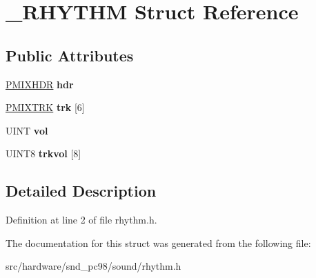 \hypertarget{struct__RHYTHM}{\section{\-\_\-\-R\-H\-Y\-T\-H\-M Struct Reference}
\label{struct__RHYTHM}
}
\subsection*{Public Attributes}
\begin{DoxyCompactItemize}
\item 
\hypertarget{struct__RHYTHM_a12128f9bf695c8169ceeaec1858d3e5b}{\hyperlink{structPMIXHDR}{P\-M\-I\-X\-H\-D\-R} {\bfseries hdr}}\label{struct__RHYTHM_a12128f9bf695c8169ceeaec1858d3e5b}

\item 
\hypertarget{struct__RHYTHM_ab7a544b57e99acaf414eb847476dc15a}{\hyperlink{structPMIXTRK}{P\-M\-I\-X\-T\-R\-K} {\bfseries trk} \mbox{[}6\mbox{]}}\label{struct__RHYTHM_ab7a544b57e99acaf414eb847476dc15a}

\item 
\hypertarget{struct__RHYTHM_a82d0398c7c408620db1954ad2ec5e4e6}{U\-I\-N\-T {\bfseries vol}}\label{struct__RHYTHM_a82d0398c7c408620db1954ad2ec5e4e6}

\item 
\hypertarget{struct__RHYTHM_ae6dc34f8868cc782c2e705e3519ef3a0}{U\-I\-N\-T8 {\bfseries trkvol} \mbox{[}8\mbox{]}}\label{struct__RHYTHM_ae6dc34f8868cc782c2e705e3519ef3a0}

\end{DoxyCompactItemize}


\subsection{Detailed Description}


Definition at line 2 of file rhythm.\-h.



The documentation for this struct was generated from the following file\-:\begin{DoxyCompactItemize}
\item 
src/hardware/snd\-\_\-pc98/sound/rhythm.\-h\end{DoxyCompactItemize}
